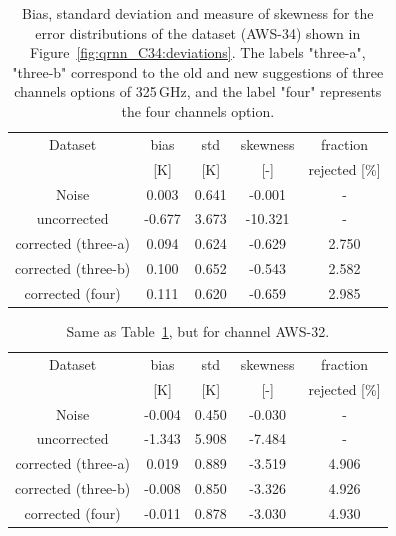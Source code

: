 \documentclass[12pt]{article}
\begin{document}
\begin{table}[!p]
	\centering
	\begin{tabular}[b]{c|c|c|c|c}
		Dataset  		  &   bias &   std &   skewness & fraction  \\
		&   [K]  &   [K] & [-] & rejected [\%]\\
		\hline
		Noise                       &  0.003 & 0.641 &             -0.001 &      - \\
		uncorrected                 & -0.677 & 3.673 &            -10.321 &      - \\
		corrected (three-a) 		&  0.094 & 0.624 &             -0.629 &      2.750 \\
		corrected (three-b) 		&  0.100 & 0.652 &             -0.543 &      2.582 \\
		corrected (four)   			&  0.111 & 0.620 &             -0.659 &      2.985 \\
		\hline
	\end{tabular}
	\caption{ Bias, standard deviation and measure of skewness for the error distributions of the dataset (AWS-34) shown in Figure~\ref{fig:qrnn_C34:deviations}. The labels "three-a", "three-b" correspond to the old and new suggestions of three channels options of 325\,GHz, and the label "four" represents the four channels option.}
	\label{tab:qrnn:C34}
\end{table}

\begin{table}[!p]
	\centering
	\begin{tabular}[b]{c|c|c|c|c}
		Dataset  		  &   bias &   std &   skewness & fraction  \\
		&   [K]  &   [K] & [-] & rejected [\%]\\
		\hline
		Noise                       & -0.004 & 0.450 &             -0.030 &      - \\
		uncorrected                 & -1.343 & 5.908 &             -7.484 &      - \\
		corrected (three-a)  		&  0.019 & 0.889 &             -3.519 &      4.906 \\	 
		corrected (three-b)  		& -0.008 & 0.850 &             -3.326 &      4.926 \\			
		corrected (four)    		& -0.011 & 0.878 &             -3.030 &      4.930 \\
		\hline
	\end{tabular}
	\caption{ Same as Table~\ref{tab:qrnn:C34}, but for channel AWS-32.}
	\label{tab:qrnn:C32}
\end{table}
\end{document}
